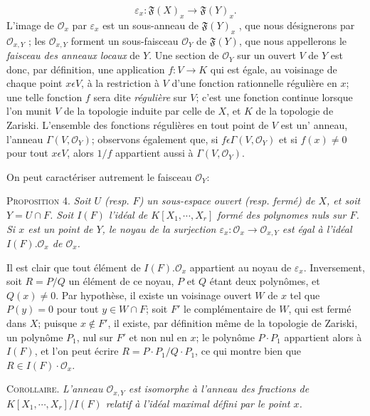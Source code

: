 \begin{equation*}
\varepsilon_x : \mathfrak{F}(X)_x \longrightarrow \mathfrak{F}(Y)_x .
\end{equation*}
L'image de $\mathcal{O}_x$ par $\varepsilon_x$ est un sous-anneau de $\mathfrak{F}(Y)_x$ , que nous désignerons par $\mathcal{O}_{x,Y}$ ; les $\mathcal{O}_{x,Y}$ forment un sous-faisceau $\mathcal{O}_Y$ de $\mathfrak{F}(Y)$, que nous appellerons le \textit{faisceau des anneaux locaux} de $Y$. Une section de $\mathcal{O}_Y$ sur un ouvert $V$ de $Y$ est donc, par définition, une application $f : V \to K$ qui est égale, au voisinage de chaque point $x \epsilon V$, à la restriction à $V$ d'une fonction rationnelle régulière en $x$; une telle fonction $f$ sera dite \textit{régulière} sur $V$; c'est une fonction continue lorsque l'on munit $V$ de la topologie induite par celle de $X$, et $K$ de la topologie de Zariski. L'ensemble des fonctions régulières en tout point de $V$ est un' anneau, l'anneau $\Gamma(V, \mathcal{O}_Y)$; observons également que, si $f \epsilon \Gamma(V, \mathcal{O}_Y)$ et si $f(x) \neq 0$ pour tout $x \epsilon V$, alors $1/f$ appartient aussi à $\Gamma(V, \mathcal{O}_Y)$.



On peut caractériser autrement le faisceau $\mathcal{O}_Y$:

\textsc{Proposition 4.} \textit{Soit $U$ (resp. $F$) un sous-espace ouvert (resp. fermé) de $X$, et soit $Y = U \cap F$. Soit $I(F)$ l'idéal de $K[X_1, \cdots, X_r]$ formé des polynomes nuls sur $F$. Si $x$ est un point de $Y$, le noyau de la surjection $\varepsilon_x\colon \mathcal{O}_x \longrightarrow \mathcal{O}_{x,Y}$ est égal à l'idéal $I(F).\mathcal{O}_x$ de $\mathcal{O}_x$.}

Il est clair que tout élément de $I(F).\mathcal{O}_x$ appartient au noyau de $\varepsilon_x$. Inversement, soit $R = P/Q$ un élément de ce noyau, $P$ et $Q$ étant deux polynômes, et $Q(x) \neq 0$. Par hypothèse, il existe un voisinage ouvert $W$ de $x$ tel que $P(y) = 0$ pour tout $y \in W \cap F$; soit $F'$ le complémentaire de $W$, qui est fermé dans $X$; puisque $x \notin F'$, il existe, par définition même de la topologie de Zariski, un polynôme $P_1$, nul sur $F'$ et non nul en $x$; le polynôme $P \cdot P_1$ appartient alors à $I(F)$, et l'on peut écrire $R = P \cdot P_1/Q \cdot P_1$, ce qui montre bien que $R \in I(F) \cdot \mathcal{O}_x$.

\textsc{Corollaire.} \textit{L'anneau $\mathcal{O}_{x,Y}$ est isomorphe à l'anneau des fractions de $K[X_1, \cdots, X_r]/I(F)$ relatif à l'idéal maximal défini par le point $x$.}

